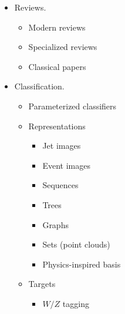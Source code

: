 \documentclass[12pt,letterpaper]{article}
\begin{document}
\begin{itemize}
\item Reviews.
	\begin{itemize}
		\item Modern reviews~\cite{Larkoski:2017jix,Guest:2018yhq,Albertsson:2018maf,Radovic:2018dip,Carleo:2019ptp,Bourilkov:2019yoi}
		\item Specialized reviews~\cite{Kasieczka:2019dbj,1807719,1808887,Psihas:2020pby,Butter:2020tvl,Forte:2020yip,Brehmer:2020cvb,Nachman:2020ccu,Duarte:2020ngm,Vlimant:2020enz}
		 \item Classical papers~\cite{Denby:1987rk,Lonnblad:1990bi}
	\end{itemize}
\item Classification.
	\begin{itemize}
		\item Parameterized classifiers~\cite{Baldi:2016fzo,Cranmer:2015bka}
		\item Representations
			\begin{itemize}
				\item Jet images~\cite{Pumplin:1991kc,Cogan:2014oua,Almeida:2015jua,deOliveira:2015xxd,ATL-PHYS-PUB-2017-017,Lin:2018cin,Komiske:2018oaa,Barnard:2016qma,Komiske:2016rsd,Kasieczka:2017nvn,Macaluso:2018tck,li2020reconstructing,li2020attention,Lee:2019cad}
				\item Event images~\cite{Nguyen:2018ugw,ATL-PHYS-PUB-2019-028,Lin:2018cin,Andrews:2018nwy,Chung:2020ysf}
				\item Sequences~\cite{Guest:2016iqz,Nguyen:2018ugw,Bols:2020bkb}
				\item Trees~\cite{Louppe:2017ipp,Cheng:2017rdo}
				\item Graphs~\cite{Henrion:DLPS2017,Ju:2020xty,Martinez:2018fwc,Moreno:2019bmu,Qasim:2019otl,Chakraborty:2019imr,Chakraborty:2020yfc,1797439,1801423,1808887,Iiyama:2020wap,1811770,Choma:2020cry,alonsomonsalve2020graph,guo2020boosted,Heintz:2020soy}
				\item Sets (point clouds)~\cite{Komiske:2018cqr,Qu:2019gqs,Mikuni:2020wpr,Shlomi:2020ufi,Dolan:2020qkr,Fenton:2020woz,Lee:2020qil}
				\item Physics-inspired basis~\cite{Datta:2019,Datta:2017rhs,Datta:2017lxt,Komiske:2017aww,Butter:2017cot}
			\end{itemize}
		\item Targets
			\begin{itemize}
			\item $W/Z$ tagging~\cite{deOliveira:2015xxd,Barnard:2016qma,Louppe:2017ipp,Sirunyan:2020lcu,Chen:2019uar,1811770}

\end{itemize}
\end{itemize}
\end{itemize}
\end{document}
